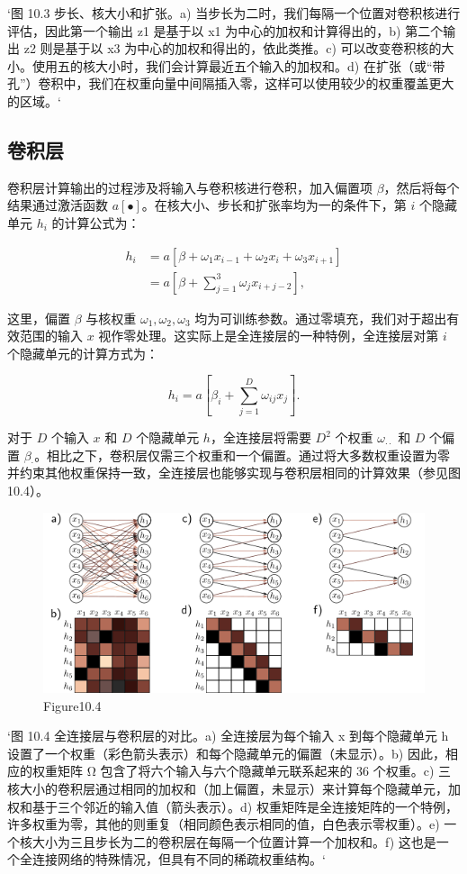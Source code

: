 `图 10.3 步长、核大小和扩张。a) 当步长为二时，我们每隔一个位置对卷积核进行评估，因此第一个输出 z1 是基于以 x1 为中心的加权和计算得出的，b) 第二个输出 z2 则是基于以 x3 为中心的加权和得出的，依此类推。c) 可以改变卷积核的大小。使用五的核大小时，我们会计算最近五个输入的加权和。d) 在扩张（或“带孔”）卷积中，我们在权重向量中间隔插入零，这样可以使用较少的权重覆盖更大的区域。`


\subsection{卷积层}
卷积层计算输出的过程涉及将输入与卷积核进行卷积，加入偏置项 \(\beta\)，然后将每个结果通过激活函数 \(a[•]\)。在核大小、步长和扩张率均为一的条件下，第 \(i\) 个隐藏单元 \(h_i\) 的计算公式为：


\begin{align}
h_i &= a \left[ \beta + \omega_1 x_{i-1} + \omega_2 x_i + \omega_3 x_{i+1} \right] \\
&= a \left[ \beta + \sum_{j=1}^{3} \omega_j x_{i+j-2} \right],
\end{align} 

这里，偏置 \(\beta\) 与核权重 \(\omega_1, \omega_2, \omega_3\) 均为可训练参数。通过零填充，我们对于超出有效范围的输入 \(x\) 视作零处理。这实际上是全连接层的一种特例，全连接层对第 \(i\) 个隐藏单元的计算方式为：

\[
h_i = a \left[ \beta_i + \sum_{j=1}^{D} \omega_{ij} x_j \right]. \tag{10.5}
\]

对于 \(D\) 个输入 \(x\) 和 \(D\) 个隐藏单元 \(h\)，全连接层将需要 \(D^2\) 个权重 \(\omega_{\cdot \cdot}\) 和 \(D\) 个偏置 \(\beta_{\cdot}\)。相比之下，卷积层仅需三个权重和一个偏置。通过将大多数权重设置为零并约束其他权重保持一致，全连接层也能够实现与卷积层相同的计算效果（参见图 10.4）。


\begin{figure}[h!]
\centering
\includegraphics[width=0.7\linewidth]{png/chapter10/Conv2a.png}
\caption{Figure10.4}
\end{figure}

`图 10.4 全连接层与卷积层的对比。a) 全连接层为每个输入 x 到每个隐藏单元 h 设置了一个权重（彩色箭头表示）和每个隐藏单元的偏置（未显示）。b) 因此，相应的权重矩阵 Ω 包含了将六个输入与六个隐藏单元联系起来的 36 个权重。c) 三核大小的卷积层通过相同的加权和（加上偏置，未显示）来计算每个隐藏单元，加权和基于三个邻近的输入值（箭头表示）。d) 权重矩阵是全连接矩阵的一个特例，许多权重为零，其他的则重复（相同颜色表示相同的值，白色表示零权重）。e) 一个核大小为三且步长为二的卷积层在每隔一个位置计算一个加权和。f) 这也是一个全连接网络的特殊情况，但具有不同的稀疏权重结构。`

